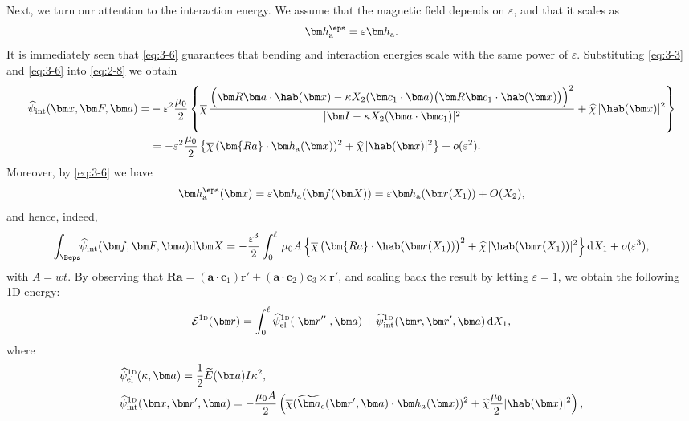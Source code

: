 \documentclass[oneside]{article}
\begin{document}
			
			
			Next, we turn our attention to the interaction energy. We assume that the magnetic field depends on $\varepsilon$, and that it scales as
			\begin{equation}\label{eq:3-6}
			\bm h^\eps_{\text a}=\varepsilon\bm h_{\text a}.
			\end{equation}
			It is immediately seen that \eqref{eq:3-6} guarantees that bending and interaction energies scale with the same power of $\varepsilon$. Substituting \eqref{eq:3-3} and \eqref{eq:3-6} into \eqref{eq:2-8} we obtain
			\begin{align}
			\widehat\psi_{\text{int}}(\bm x,\bm F,\bm a)=&-\varepsilon^2\frac{\mu_0}{2}\left\lbrace\overline\chi\,\frac{\Big(\bm R\bm a\cdot\hab(\bm x) -\kappa X_2(\bm c_1\cdot\bm a)\big(\bm R\bm c_1\cdot\hab(\bm x)\big)\Big)^2}{|\bm I-\kappa X_2(\bm a\cdot\bm c_1)|^2}+\widehat\chi\,|\hab(\bm x)|^2 \right\rbrace\notag\\
			&=-\varepsilon^2\frac {\mu_0}{2}\left\lbrace\overline{\chi}\,(\bm{Ra}\cdot\bm h_{\text{a}}(\bm x))^2+ \widehat{\chi}\,|\hab(\bm x)|^2\right\rbrace+o(\varepsilon^2).
			\end{align}
			Moreover, by \eqref{eq:3-6} we have
			\begin{equation}
			\bm h^\eps_{\text a}(\bm x)=\varepsilon\bm h_{\text a}(\bm f(\bm X))=\varepsilon\bm h_{\text a}(\bm r(X_1))+O(X_2),
			\end{equation}
			and hence, indeed,
			\begin{equation}
			\begin{aligned}
			\int_{\Beps}\!\!\widehat\psi_{\text{int}}(\bm f,\bm F,\bm a){{\text{d}}\bm X}=-\frac{\varepsilon^3}2\int_0^\ell\,\mu_0A\left\lbrace \overline{\chi}\,\big(\bm{Ra}\cdot\hab(\bm r(X_1))\big)^2+\widehat{\chi}\,|\hab(\bm r(X_1))|^2\right\rbrace\text{d}X_1+o(\varepsilon^3),
			\end{aligned}\label{psimag}
			\end{equation}
			with $A={wt}$. 
			By  observing that $\bm R\bm a=(\bm a\cdot\bm c_1)\bm r'+(\bm a\cdot\bm c_2)\bm c_3\times\bm r'$, and scaling back the result by letting $\varepsilon=1$,  we obtain the following 1D energy:
			\begin{equation}\label{rod_energy}
			\mathcal E^{1\textsc d}(\bm r)=\int_0^\ell \widehat\psi^{1\textsc d}_{\text{el}}(|\bm r''|,\bm a)+\widehat\psi^{1\textsc d}_{\text{int}}(\bm r,\bm r',\bm a)\,\text{d}X_1,
			\end{equation}
			where
			\begin{align}
			&\widehat\psi_{\text{el}}^{1\textsc d}(\kappa,\bm a)=\frac{1}{2}{\widetilde E}(\bm a)I\kappa^2,\\
			&\widehat\psi_{\text{int}}^{1\textsc d}(\bm x,\bm r',\bm a)=-\frac {\mu_0 A}2\left(\overline\chi(\widetilde{\bm a}_c(\bm r',\bm a)\cdot\bm h_a(\bm x))^2+\widehat{\chi}\frac{\mu_0}{2} |\hab(\bm x)|^2\right),\label{eq:3-8}
			\end{align}
\end{document}
